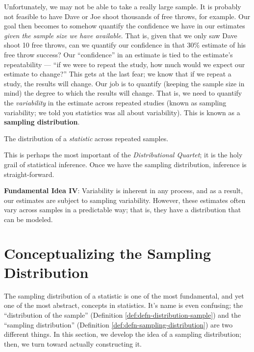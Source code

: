 \documentclass[]{book}
\theoremstyle{definition}
\theoremstyle{definition}
\theoremstyle{remark}
\let\BeginKnitrBlock\begin \let\EndKnitrBlock\end
\begin{document}
Unfortunately, we may not be able to take a really large sample. It is
probably not feasible to have Dave or Joe shoot thousands of free
throws, for example. Our goal then becomes to somehow quantify the
confidence we have in our estimates \emph{given the sample size we have
available}. That is, given that we only saw Dave shoot 10 free throws,
can we quantify our confidence in that 30\% estimate of his free throw
success? Our ``confidence'' in an estimate is tied to the estimate's
repeatability --- ``if we were to repeat the study, how much would we
expect our estimate to change?'' This gets at the last fear; we know
that if we repeat a study, the results will change. Our job is to
quantify (keeping the sample size in mind) the degree to which the
results will change. That is, we need to quantify the \emph{variability}
in the estimate across repeated studies (known as sampling variability;
we told you statistics was all about variability). This is known as a
\textbf{sampling distribution}.

\BeginKnitrBlock{definition}[Sampling Distribution]
\protect\hypertarget{def:defn-sampling-distribution}{}{\label{def:defn-sampling-distribution}
{} }The distribution of a
\emph{statistic} across repeated samples.
\EndKnitrBlock{definition}

This is perhaps the most important of the \emph{Distributional Quartet};
it is the holy grail of statistical inference. Once we have the sampling
distribution, inference is straight-forward.

\BeginKnitrBlock{rmdfivefund}
\textbf{Fundamental Idea IV}: Variability is inherent in any process,
and as a result, our estimates are subject to sampling variability.
However, these estimates often vary across samples in a predictable way;
that is, they have a distribution that can be modeled.
\EndKnitrBlock{rmdfivefund}

\section{Conceptualizing the Sampling
Distribution}\label{conceptualizing-the-sampling-distribution}

The sampling distribution of a statistic is one of the most fundamental,
and yet one of the most abstract, concepts in statistics. It's name is
even confusing; the ``distribution of the sample'' (Definition
\ref{def:defn-distribution-sample}) and the ``sampling distribution''
(Definition \ref{def:defn-sampling-distribution}) are two different
things. In this section, we develop the idea of a sampling distribution;
then, we turn toward actually constructing it.
\end{document}
